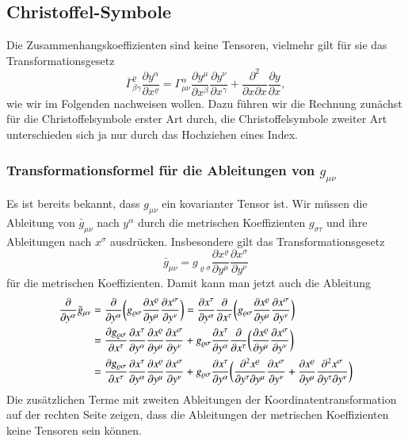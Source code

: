 \subsection{Christoffel-Symbole}
Die Zusammenhangskoeffizienten sind keine Tensoren, vielmehr gilt für sie das
Transformationsgesetz
\[
\bar\Gamma^\varrho_{\beta\gamma}
\frac{\partial y^\alpha}{\partial x^\varrho}
=
\Gamma^\alpha_{\mu\nu}
\frac{\partial y^\mu}{\partial x^\beta}
\frac{\partial y^\nu}{\partial x^\gamma}
+
\frac{\partial^2}{\partial x\partial x}
\frac{\partial y}{\partial x},
\]
wie wir im Folgenden nachweisen wollen.
Dazu führen wir die Rechnung zunächst für die Christoffelsymbole
erster Art durch, die Christoffelsymbole zweiter Art unterschieden sich
ja nur durch das Hochziehen eines Index.

\subsubsection{Transformationsformel für die Ableitungen von $g_{\mu\nu}$}
Es ist bereits bekannt, dass $g_{\mu\nu}$ ein kovarianter Tensor ist.
Wir müssen die Ableitung von $\bar g_{\mu\nu}$ nach $y^\alpha$ durch
die metrischen Koeffizienten $g_{\sigma\tau}$ und ihre Ableitungen
nach $x^\sigma$ ausdrücken.
Insbesondere gilt das Transformationsgesetz
\begin{equation*}
\bar g_{\mu\nu}
=
g_{\varrho\sigma}
\frac{\partial x^\varrho}{\partial y^\mu}
\frac{\partial x^\sigma}{\partial y^\nu}
\end{equation*}
für die metrischen Koeffizienten. 
Damit kann man jetzt auch die Ableitung 
\begin{align}
\frac{\partial}{\partial y^\alpha}\bar g_{\mu\nu}
&=
\frac{\partial}{\partial y^\alpha} 
\biggl(
g_{\varrho\sigma}
\frac{\partial x^\varrho}{\partial y^\mu}
\frac{\partial x^\sigma}{\partial y^\nu}
\biggr)
=
\frac{\partial x^\tau}{\partial y^\alpha}
\frac{\partial}{\partial x^\tau}
\biggl(
g_{\varrho\sigma}
\frac{\partial x^\varrho}{\partial y^\mu}
\frac{\partial x^\sigma}{\partial y^\nu}
\biggr)
\notag
\\
&=
\frac{\partial g_{\varrho\sigma}}{\partial x^\tau}
\frac{\partial x^\tau}{\partial y^\alpha}
\frac{\partial x^\varrho}{\partial y^\mu}
\frac{\partial x^\sigma}{\partial y^\nu}
+
g_{\varrho\sigma}
\frac{\partial x^\tau}{\partial y^\alpha}
\frac{\partial}{\partial x^\tau}
\biggl(
\frac{\partial x^\varrho}{\partial y^\mu}
\frac{\partial x^\sigma}{\partial y^\nu}
\biggr)
\notag
\\
&=
\frac{\partial g_{\varrho\sigma}}{\partial x^\tau}
\frac{\partial x^\tau}{\partial y^\alpha}
\frac{\partial x^\varrho}{\partial y^\mu}
\frac{\partial x^\sigma}{\partial y^\nu}
+
g_{\varrho\sigma}
\frac{\partial x^\tau}{\partial y^\alpha}
\biggl(
\frac{\partial^2 x^\varrho}{\partial y^\tau\partial y^\mu}
\frac{\partial x^\sigma}{\partial y^\nu}
+
\frac{\partial x^\varrho}{\partial y^\mu}
\frac{\partial^2 x^\sigma}{\partial y^\tau\partial y^\nu}
\biggr)
\label{skript:trafo:gabl}
\end{align}
Die zusätzlichen Terme mit zweiten Ableitungen der Koordinatentransformation
auf der rechten Seite zeigen, dass die Ableitungen der metrischen Koeffizienten
keine Tensoren sein können.

